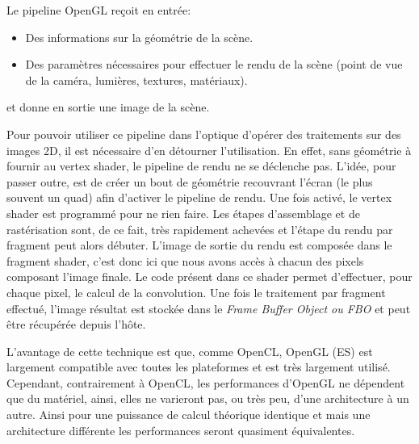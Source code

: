 
Le pipeline OpenGL reçoit en entrée:
\begin{itemize}
\item Des informations sur la géométrie de la scène.
\item Des paramètres nécessaires pour effectuer le rendu de la scène (point de vue de la caméra, lumières, textures, matériaux).
\end{itemize}
et donne en sortie une image de la scène.

Pour pouvoir utiliser ce pipeline dans l'optique d'opérer des traitements sur des images 2D, il est nécessaire d'en détourner l'utilisation. En effet, sans géométrie à fournir au vertex shader, le pipeline de rendu ne se déclenche pas. L'idée, pour passer outre, est de créer un bout de géométrie recouvrant l'écran (le plus souvent un quad) afin d'activer le pipeline de rendu. Une fois activé, le vertex shader est programmé pour ne rien faire. Les étapes d'assemblage et de rastérisation sont, de ce fait, très rapidement achevées et l'étape du rendu par fragment peut alors débuter. L'image de sortie du rendu est composée dans le fragment shader, c'est donc ici que nous avons accès à chacun des pixels composant l'image finale. Le code présent dans ce shader permet d'effectuer, pour chaque pixel, le calcul de la convolution. Une fois le traitement par fragment effectué, l'image résultat est stockée dans le \emph{Frame Buffer Object ou FBO} et peut être récupérée depuis l'hôte.

L'avantage de cette technique est que, comme OpenCL, OpenGL (ES) est largement compatible avec toutes les plateformes et est très largement utilisé. Cependant, contrairement à OpenCL, les performances d'OpenGL ne dépendent que du matériel, ainsi, elles ne varieront pas, ou très peu, d'une architecture à un autre. Ainsi pour une puissance de calcul théorique identique et mais une architecture différente les performances seront quasiment équivalentes.

